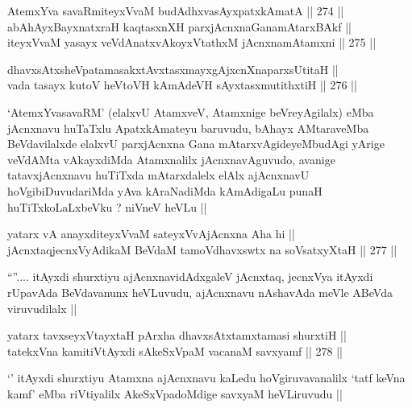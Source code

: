 \begin{shl}
AtemxYva savaRmiteyxVvaM budAdhxvasAyx\s \s patxkAmatA ||  274 ||  \\
abAhAyxBayxnatxraH kaqtasxnXH parxjAcnxnaGanamAtarxBAkf || \\
iteyxVvaM yasayx veVdAnatxvAkoyxVtathxM jAcnxnamAtamxni ||  275 ||  
\end{shl}
				
\begin{shl}
dhavxsAtxsheVpatamasakxtAvxtasxmayxgAjxcnXnaparxsUtitaH || \\
vada tasayx kutoV heVtoVH kAmAdeVH sAyxtasxmutithxtiH ||  276 ||  
\end{shl}

\begin{artha}
`AtemxYvasavaRM' (elalxvU AtamxveV, Atamxnige beVreyAgilalx) eMba
  jAcnxnavu huTaTxlu ApatxkAmateyu baruvudu, bAhayx AMtaraveMba
  BeVdavilalxde elalxvU parxjAcnxna Gana mAtarxvAgideyeMbudAgi yArige
  veVdAMta vAkayxdiMda Atamxnalilx jAcnxnavAguvudo, avanige
  tatavxjAcnxnavu huTiTxda mAtarxdalelx elAlx ajAcnxnavU
  hoVgibiDuvudariMda yAva kAraNadiMda kAmAdigaLu punaH
  huTiTxkoLaLxbeVku ? niVneV heVLu ||
\end{artha}


\begin{shl}
yatarx vA anayxditeyxVvaM sateyxVvAjAcnxna Aha hi || \\
jAcnxtaqjecnxVyAdikaM BeVdaM tamoVdhavxswtx na soV\s satxyXtaH ||  277 || 
\end{shl}

\begin{artha}
``\stext''.... itAyxdi shurxtiyu ajAcnxnavidAdxgaleV jAcnxtaq, jecnxVya
  itAyxdi rUpavAda BeVdavanunx heVLuvudu, ajAcnxnavu nAshavAda meVle
  ABeVda viruvudilalx ||    
\end{artha}


\begin{shl}
yatarx tavxseyxVtayxtaH pArxha dhavxsAtxtamxtamasi shurxtiH || \\
tatekxVna kamitiVtAyxdi sAkeSxVpaM vacanaM savxyamf ||  278 ||   
\end{shl}

\begin{artha}
`\stext' itAyxdi shurxtiyu Atamxna ajAcnxnavu kaLedu hoVgiruvavanalilx
  `tatf keVna kamf' eMba riVtiyalilx AkeSxVpadoMdige savxyaM
  heVLiruvudu ||
\end{artha}

